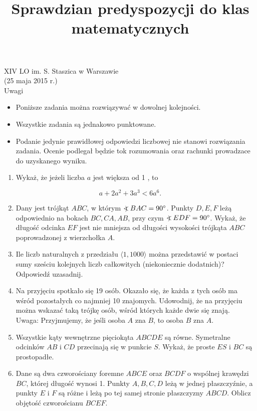 \documentclass[10pt]{article}
\title{Sprawdzian predyspozycji do klas matematycznych }
\author{}
\date{}
\newcommand\Varangle{\mathop{{<\!\!\!\!\!\text{\small)}}\:}\nolimits}
\begin{document}
\maketitle
XIV LO im. S. Staszica w Warszawie\\
(25 maja 2015 r.)\\
Uwagi

\begin{itemize}
  \item Poniższe zadania można rozwiązywać w dowolnej kolejności.
  \item Wszystkie zadania są jednakowo punktowane.
  \item Podanie jedynie prawidłowej odpowiedzi liczbowej nie stanowi rozwiązania zadania. Ocenie podlegał będzie tok rozumowania oraz rachunki prowadzace do uzyskanego wyniku.
\end{itemize}

\begin{enumerate}
  \item Wykaż, że jeżeli liczba \(a\) jest większa od 1 , to
\end{enumerate}

\[
a+2 a^{2}+3 a^{3}<6 a^{6} .
\]

\begin{enumerate}
  \setcounter{enumi}{1}
  \item Dany jest trójkąt \(A B C\), w którym \(\Varangle B A C=90^{\circ}\). Punkty \(D, E, F\) leżą odpowiednio na bokach \(B C, C A, A B\), przy czym \(\Varangle E D F=90^{\circ}\). Wykaż, że długość odcinka \(E F\) jest nie mniejsza od długości wysokości trójkąta \(A B C\) poprowadzonej z wierzchołka \(A\).
  \item Ile liczb naturalnych z przedziału \(\langle 1,1000\rangle\) można przedstawić w postaci sumy sześciu kolejnych liczb całkowitych (niekoniecznie dodatnich)? Odpowiedź uzasadnij.
  \item Na przyjęciu spotkało się 19 osób. Okazało się, że każda z tych osób ma wśród pozostałych co najmniej 10 znajomych. Udowodnij, że na przyjęciu można wskazać taką trójkę osób, wśród których każde dwie się znają.\\
Uwaga: Przyjmujemy, że jeśli osoba \(A\) zna \(B\), to osoba \(B\) zna \(A\).
  \item Wszystkie kąty wewnętrzne pięciokąta \(A B C D E\) są równe. Symetralne odcinków \(A B\) i \(C D\) przecinają się w punkcie \(S\). Wykaż, że proste \(E S\) i \(B C\) są prostopadłe.
  \item Dane są dwa czworościany foremne \(A B C E\) oraz \(B C D F\) o wspólnej krawędzi \(B C\), której długość wynosi 1. Punkty \(A, B, C, D\) leżą w jednej płaszczyźnie, a punkty \(E\) i \(F\) są różne i leżą po tej samej stronie płaszczyzny \(A B C D\). Oblicz objętość czworościanu \(B C E F\).
\end{enumerate}
\end{document}

